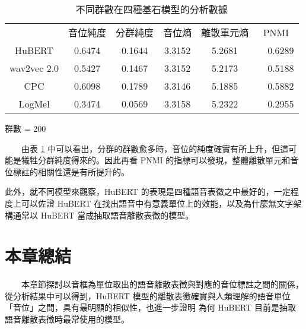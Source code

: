 \begin{table}[!htbp]
            \vspace{0.5cm}        

            \begin{subtable}[t]{\textwidth}
                \centering
                \begin{tabular}{cccccc}
                                & 音位純度 & 分群純度 & 音位熵 & 離散單元熵 &    PNMI \\
                    HuBERT      &   0.6474 &   0.1644 & 3.3152 &     5.2681 &　0.6289 \\   %
                    wav2vec 2.0 &   0.5427 &   0.1467 & 3.3152 &     5.2173 &　0.5188 \\   %
                    CPC         &   0.6098 &   0.1789 & 3.3146 &     5.1885 &　0.5882 \\   %
                    LogMel      &   0.3474 &   0.0569 & 3.3158 &     5.2322 &　0.2955 \\   %
                \end{tabular}
                \caption{群數 = 200}
                \label{tab:ch3-clu200}
            \end{subtable}        

            \caption{不同群數在四種基石模型的分析數據}
            \label{tab:single-cluster-results}
        \end{table}

　　由表 \ref{tab:single-cluster-results} 中可以看出，分群的群數愈多時，音位的純度確實有所上升，但這可能是犧牲分群純度得來的。因此再看 PNMI 的指標可以發現，整體離散單元和音位標註的相關性還是有所提升的。

        此外，就不同模型來觀察，HuBERT 的表現是四種語音表徵之中最好的，一定程度上可以佐證 HuBERT 在找出語音中有意義單位上的效能，以及為什麼無文字架構通常以 HuBERT 當成抽取語音離散表徵的模型。



\section{本章總結}

　　本章節探討以音框為單位取出的語音離散表徵與對應的音位標註之間的關係，從分析結果中可以得到，HuBERT 模型的離散表徵確實與人類理解的語音單位「音位」之間，具有最明顯的相似性，也進一步證明
為何 HuBERT 目前是抽取語音離散表徵時最常使用的模型。
